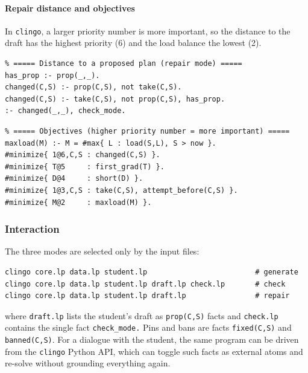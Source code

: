 \paragraph{Repair distance and objectives}
In \texttt{clingo}, a larger priority number is more important, so the
distance to the draft has the highest priority (6) and the load balance the
lowest (2).
\begin{lstlisting}
% ===== Distance to a proposed plan (repair mode) =====
has_prop :- prop(_,_).
changed(C,S) :- prop(C,S), not take(C,S).
changed(C,S) :- take(C,S), not prop(C,S), has_prop.
:- changed(_,_), check_mode.
\end{lstlisting}
\begin{lstlisting}
% ===== Objectives (higher priority number = more important) =====
maxload(M) :- M = #max{ L : load(S,L), S > now }.
#minimize{ 1@6,C,S : changed(C,S) }.
#minimize{ T@5     : first_grad(T) }.
#minimize{ D@4     : short(D) }.
#minimize{ 1@3,C,S : take(C,S), attempt_before(C,S) }.
#minimize{ M@2     : maxload(M) }.
\end{lstlisting}
 
\subsubsection{Interaction}
 
The three modes are selected only by the input files:
\begin{lstlisting}[language={},basicstyle=\ttfamily\footnotesize]
clingo core.lp data.lp student.lp                         # generate
clingo core.lp data.lp student.lp draft.lp check.lp       # check
clingo core.lp data.lp student.lp draft.lp                # repair
\end{lstlisting}
where \texttt{draft.lp} lists the student's draft as \texttt{prop(C,S)} facts
and \texttt{check.lp} contains the single fact \texttt{check\_mode.}
Pins and bans are facts \texttt{fixed(C,S)} and \texttt{banned(C,S)}.
For a dialogue with the student, the same program can be driven from the
\texttt{clingo} Python API, which can toggle such facts as external atoms and
re-solve without grounding everything again.
 
 
